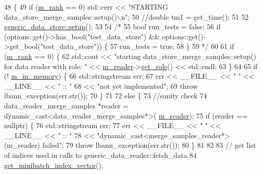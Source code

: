 \begin{DoxyCode}
48                                      \{
49   \textcolor{keywordflow}{if} (\hyperlink{classlbann_1_1generic__data__store_a87695bfd2d1ed0dbe01d99108e3f68b7}{m\_rank} == 0) std::cerr << \textcolor{stringliteral}{"STARTING data\_store\_merge\_samples::setup()\(\backslash\)n"}; 
50   \textcolor{comment}{//double tm1 = get\_time();}
51 
52   \hyperlink{classlbann_1_1generic__data__store_a1cff17def02ee21b6ca0befeb04bb582}{generic\_data\_store::setup}();
53 
54 \textcolor{comment}{/*}
55 \textcolor{comment}{  bool run\_tests = false;}
56 \textcolor{comment}{  if (options::get()->has\_bool("test\_data\_store") && options::get()->get\_bool("test\_data\_store")) \{}
57 \textcolor{comment}{    run\_tests = true;}
58 \textcolor{comment}{  \}}
59 \textcolor{comment}{  */}
60 
61   \textcolor{keywordflow}{if} (\hyperlink{classlbann_1_1generic__data__store_a87695bfd2d1ed0dbe01d99108e3f68b7}{m\_rank} == 0) \{
62     std::cout << \textcolor{stringliteral}{"starting data\_store\_merge\_samples::setup() for data reader with role: "} << 
      \hyperlink{classlbann_1_1generic__data__store_afa49ced0ab64c632371ea52532a91ec2}{m\_reader}->\hyperlink{classlbann_1_1generic__data__reader_a92982e1b399f37e2ead5aa440883cba5}{get\_role}() << std::endl;
63   \}
64   
65   \textcolor{keywordflow}{if} (! \hyperlink{classlbann_1_1generic__data__store_a1a9cc7b097cd7dd6ae0d12d52bb43ea1}{m\_in\_memory}) \{
66     std::stringstream err;
67     err << \_\_FILE\_\_ << \textcolor{stringliteral}{" "} << \_\_LINE\_\_ << \textcolor{stringliteral}{" :: "}
68         << \textcolor{stringliteral}{"not yet implemented"};
69     \textcolor{keywordflow}{throw} lbann\_exception(err.str());
70   \} 
71   
72   \textcolor{keywordflow}{else} \{
73     \textcolor{comment}{//sanity check}
74     data\_reader\_merge\_samples *reader = \textcolor{keyword}{dynamic\_cast<}data\_reader\_merge\_samples*\textcolor{keyword}{>}(
      \hyperlink{classlbann_1_1generic__data__store_afa49ced0ab64c632371ea52532a91ec2}{m\_reader});
75     \textcolor{keywordflow}{if} (reader == \textcolor{keyword}{nullptr}) \{
76       std::stringstream err;
77       err << \_\_FILE\_\_ << \textcolor{stringliteral}{" "} << \_\_LINE\_\_ << \textcolor{stringliteral}{" :: "}
78           << \textcolor{stringliteral}{"dynamic\_cast<merge\_samples\_reader*>(m\_reader) failed"};
79       \textcolor{keywordflow}{throw} lbann\_exception(err.str());
80     \}
81 
82 
83     \textcolor{comment}{// get list of indices used in calls to generic\_data\_reader::fetch\_data}
84     \hyperlink{classlbann_1_1generic__data__store_ab861db5f81e45a6063b8922a331dd007}{get\_minibatch\_index\_vector}();

\end{DoxyCode}
